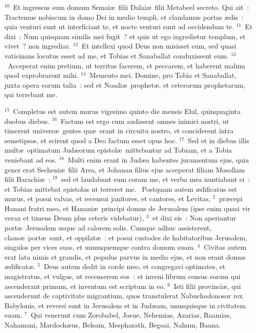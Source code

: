 ${}^{10}$~Et ingressus sum domum Semai\ae\ filii Dalai\ae\ filii Metabeel secreto. Qui ait~: Tractemus nobiscum in domo Dei in medio templi, et claudamus portas \ae dis~: quia venturi sunt ut interficiant te, et nocte venturi sunt ad occidendum te.
${}^{11}$~Et dixi~: Num quisquam similis mei fugit~? et quis ut ego ingredietur templum, et vivet~? non ingrediar.
${}^{12}$~Et intellexi quod Deus non misisset eum, sed quasi vaticinans locutus esset ad me, et Tobias et Sanaballat conduxissent eum.
${}^{13}$~Acceperat enim pretium, ut territus facerem, et peccarem, et haberent malum quod exprobrarent mihi.
${}^{14}$~Memento mei, Domine, pro Tobia et Sanaballat, juxta opera eorum talia~: sed et Noadi\ae\ prophet\ae , et ceterorum prophetarum, qui terrebant me.


${}^{15}$~Completus est autem murus vigesimo quinto die mensis Elul, quinquaginta duobus diebus.
${}^{16}$~Factum est ergo cum audissent omnes inimici nostri, ut timerent univers\ae\ gentes qu\ae\ erant in circuitu nostro, et conciderent intra semetipsos, et scirent quod a Deo factum esset opus hoc.
${}^{17}$~Sed et in diebus illis mult\ae\ optimatum Jud\ae orum epistol\ae\ mittebantur ad Tobiam, et a Tobia veniebant ad eos.
${}^{18}$~Multi enim erant in Jud\ae a habentes juramentum ejus, quia gener erat Secheni\ae\ filii Area, et Johanan filius ejus acceperat filiam Mosollam filii Barachi\ae~:
${}^{19}$~sed et laudabant eum coram me, et verba mea nuntiabant ei~: et Tobias mittebat epistolas ut terreret me.
~\lettrine[lines=10,image=true,loversize=0.05,lraise=-0.03]{P}{}ostquam autem \ae dificatus est murus, et posui valvas, et recensui janitores, et cantores, et Levitas,
${}^{2}$~pr\ae cepi Hanani fratri meo, et Hanani\ae\ principi domus de Jerusalem (ipse enim quasi vir verax et timens Deum plus ceteris videbatur),
${}^{3}$~et dixi eis~: Non aperiantur port\ae\ Jerusalem usque ad calorem solis. Cumque adhuc assisterent, claus\ae\ port\ae\ sunt, et oppilat\ae~: et posui custodes de habitatoribus Jerusalem, singulos per vices suas, et unumquemque contra domum suam.
${}^{4}$~Civitas autem erat lata nimis et grandis, et populus parvus in medio ejus, et non erant domus \ae dificat\ae .
${}^{5}$~Deus autem dedit in corde meo, et congregavi optimates, et magistratus, et vulgus, ut recenserem eos~: et inveni librum census eorum qui ascenderant primum, et inventum est scriptum in eo.
${}^{6}$~Isti filii provinci\ae , qui ascenderunt de captivitate migrantium, quos transtulerat Nabuchodonosor rex Babylonis, et reversi sunt in Jerusalem et in Jud\ae am, unusquisque in civitatem suam.
${}^{7}$~Qui venerunt cum Zorobabel, Josue, Nehemias, Azarias, Raamias, Nahamani, Mardoch\ae us, Belsam, Mespharath, Begoai, Nahum, Baana.

